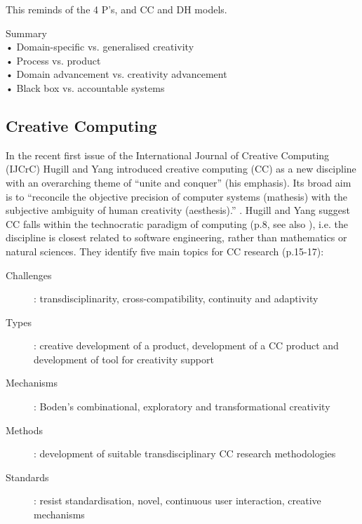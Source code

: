 \begin{draft}
  This reminds of the 4 P’s, and CC and DH models.
\end{draft}

\begin{shaded}
  Summary\\
  •	Domain-specific vs. generalised creativity\\
  •	Process vs. product\\
  •	Domain advancement vs. creativity advancement\\
  •	Black box vs. accountable systems
\end{shaded}


\subsection{Creative Computing}


In the recent first issue of the International Journal of Creative Computing (IJCrC) Hugill and Yang introduced creative computing (CC) as a new discipline \citep{Hugill2013c} with an overarching theme of ``unite and conquer'' \citep[p.1]{Yang2013}(his emphasis). Its broad aim is to ``reconcile the objective precision of computer systems (mathesis) with the subjective ambiguity of human creativity (aesthesis).'' \citep[p.5]{Hugill2013c}. Hugill and Yang suggest CC falls within the technocratic paradigm of computing (p.8, see also \citep{Eden2007}), i.e. the discipline is closest related to software engineering, rather than mathematics or natural sciences. They identify five main topics for CC research (p.15-17):

\begin{description}
  \item [Challenges]: transdisciplinarity, cross-compatibility, continuity and adaptivity
  \item [Types]: creative development of a product, development of a CC product and development of tool for creativity support
  \item [Mechanisms]:	Boden’s combinational, exploratory and transformational creativity
  \item [Methods]: development of suitable transdisciplinary CC research methodologies
  \item [Standards]: resist standardisation, novel, continuous user interaction, creative mechanisms
\end{description}

